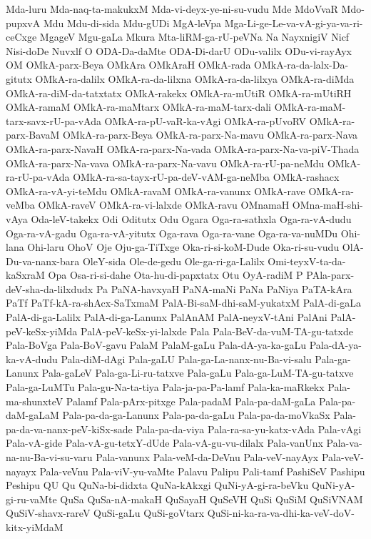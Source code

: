 {Mda-luru
Mda-naq-ta-makukxM
Mda-vi-deyx-ye-ni-su-vudu
Mde
MdoVvaR
Mdo-pupxvA
Mdu
Mdu-di-sida
Mdu-gUDi
MgA-leVpa
Mga-Li-ge-Le-va-vA-gi-ya-va-ri-ceCxge
MgageV
Mgu-gaLa
Mkura
Mta-liRM-ga-rU-peVNa
Na
NayxnigiV
Nicf
Nisi-doDe
Nuvxlf
O
ODA-Da-daMte
ODA-Di-darU
ODu-valilx
ODu-vi-rayAyx
OM
OMkA-parx-Beya
OMkAra
OMkAraH
OMkA-rada
OMkA-ra-da-lalx-Da-gitutx
OMkA-ra-dalilx
OMkA-ra-da-lilxna
OMkA-ra-da-lilxya
OMkA-ra-diMda
OMkA-ra-diM-da-tatxtatx
OMkA-rakekx
OMkA-ra-mUtiR
OMkA-ra-mUtiRH
OMkA-ramaM
OMkA-ra-maMtarx
OMkA-ra-maM-tarx-dali
OMkA-ra-maM-tarx-savx-rU-pa-vAda
OMkA-ra-pU-vaR-ka-vAgi
OMkA-ra-pUvoRV
OMkA-ra-parx-BavaM
OMkA-ra-parx-Beya
OMkA-ra-parx-Na-mavu
OMkA-ra-parx-Nava
OMkA-ra-parx-NavaH
OMkA-ra-parx-Na-vada
OMkA-ra-parx-Na-va-piV-Thada
OMkA-ra-parx-Na-vava
OMkA-ra-parx-Na-vavu
OMkA-ra-rU-pa-neMdu
OMkA-ra-rU-pa-vAda
OMkA-ra-sa-tayx-rU-pa-deV-vAM-ga-neMba
OMkA-rashacx
OMkA-ra-vA-yi-teMdu
OMkA-ravaM
OMkA-ra-vanunx
OMkA-rave
OMkA-ra-veMba
OMkA-raveV
OMkA-ra-vi-lalxde
OMkA-ravu
OMnamaH
OMna-maH-shi-vAya
Oda-leV-takekx
Odi
Oditutx
Odu
Ogara
Oga-ra-sathxla
Oga-ra-vA-dudu
Oga-ra-vA-gadu
Oga-ra-vA-yitutx
Oga-rava
Oga-ra-vane
Oga-ra-va-nuMDu
Ohi-lana
Ohi-laru
OhoV
Oje
Oju-ga-TiTxge
Oka-ri-si-koM-Dude
Oka-ri-su-vudu
OlA-Du-va-nanx-bara
OleY-sida
Ole-de-gedu
Ole-ga-ri-ga-Lalilx
Omi-teyxV-ta-da-kaSxraM
Opa
Osa-ri-si-dahe
Ota-hu-di-papxtatx
Otu
OyA-radiM
P
PAla-parx-deV-sha-da-lilxdudx
Pa
PaNA-havxyaH
PaNA-maNi
PaNa
PaNiya
PaTA-kAra
PaTf
PaTf-kA-ra-shAcx-SaTxmaM
PalA-Bi-saM-dhi-saM-yukatxM
PalA-di-gaLa
PalA-di-ga-Lalilx
PalA-di-ga-Lanunx
PalAnAM
PalA-neyxV-tAni
PalAni
PalA-peV-keSx-yiMda
PalA-peV-keSx-yi-lalxde
Pala
Pala-BeV-da-vuM-TA-gu-tatxde
Pala-BoVga
Pala-BoV-gavu
PalaM
PalaM-gaLu
Pala-dA-ya-ka-gaLu
Pala-dA-ya-ka-vA-dudu
Pala-diM-dAgi
Pala-gaLU
Pala-ga-La-nanx-nu-Ba-vi-salu
Pala-ga-Lanunx
Pala-gaLeV
Pala-ga-Li-ru-tatxve
Pala-gaLu
Pala-ga-LuM-TA-gu-tatxve
Pala-ga-LuMTu
Pala-gu-Na-ta-tiya
Pala-ja-pa-Pa-lamf
Pala-ka-maRkekx
Pala-ma-shunxteV
Palamf
Pala-pArx-pitxge
Pala-padaM
Pala-pa-daM-gaLa
Pala-pa-daM-gaLaM
Pala-pa-da-ga-Lanunx
Pala-pa-da-gaLu
Pala-pa-da-moVkaSx
Pala-pa-da-va-nanx-peV-kiSx-sade
Pala-pa-da-viya
Pala-ra-sa-yu-katx-vAda
Pala-vAgi
Pala-vA-gide
Pala-vA-gu-tetxY-dUde
Pala-vA-gu-vu-dilalx
Pala-vanUnx
Pala-va-na-nu-Ba-vi-su-varu
Pala-vanunx
Pala-veM-da-DeVnu
Pala-veV-nayAyx
Pala-veV-nayayx
Pala-veVnu
Pala-viV-yu-vaMte
Palavu
Palipu
Pali-tamf
PashiSeV
Pashipu
Peshipu
QU
Qu
QuNa-bi-didxta
QuNa-kAkxgi
QuNi-yA-gi-ra-beVku
QuNi-yA-gi-ru-vaMte
QuSa
QuSa-nA-makaH
QuSayaH
QuSeVH
QuSi
QuSiM
QuSiVNAM
QuSiV-shavx-rareV
QuSi-gaLu
QuSi-goVtarx
QuSi-ni-ka-ra-va-dhi-ka-veV-doV-kitx-yiMdaM
}
